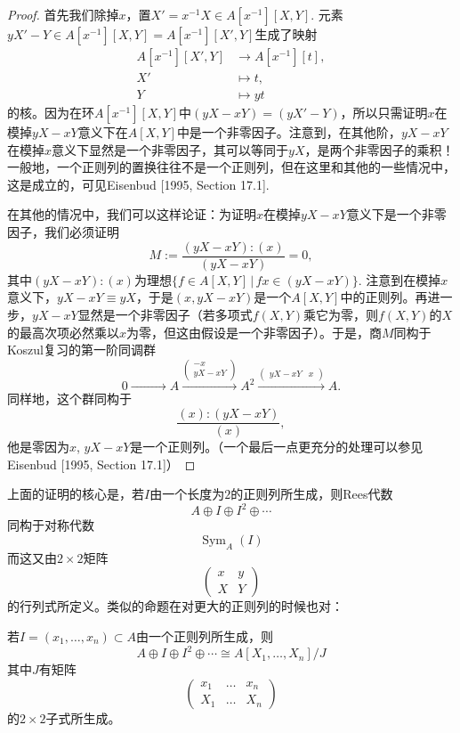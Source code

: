 \begin{proof}
首先我们除掉$x$，置$X'=x^{-1}X\in A[x^{-1}][X,Y]$. 元素$yX'-Y\in A[x^{-1}][X,Y]=A[x^{-1}][X',Y]$生成了映射
	\[
		\begin{aligned}
			A[x^{-1}][X',Y] & \longrightarrow A[x^{-1}][t],\\
			X' &\longmapsto t,\\
			Y  &\longmapsto yt
		\end{aligned}
	\]
的核。因为在环$A[x^{-1}][X,Y]$中$(yX-xY)=(yX'-Y)$，所以只需证明$x$在模掉$yX-xY$意义下在$A[X,Y]$中是一个非零因子。注意到，在其他阶，$yX-xY$在模掉$x$意义下显然是一个非零因子，其可以等同于$yX$，是两个非零因子的乘积！一般地，一个正则列的置换往往不是一个正则列，但在这里和其他的一些情况中，这是成立的，可见Eisenbud [1995, Section 17.1].

在其他的情况中，我们可以这样论证：为证明$x$在模掉$yX-xY$意义下是一个非零因子，我们必须证明
	\[
		M:=\frac{(yX-xY):(x)}{(yX-xY)}=0,
	\]
其中$(yX-xY):(x)$为理想$\{f\in A[X,Y]\,|\, fx\in (yX-xY)\}$. 注意到在模掉$x$意义下，$yX-xY\equiv yX$，于是$(x,yX-xY)$是一个$A[X,Y]$中的正则列。再进一步，$yX-xY$显然是一个非零因子（若多项式$f(X,Y)$乘它为零，则$f(X,Y)$的$X$的最高次项必然乘以$x$为零，但这由假设是一个非零因子）。于是，商$M$同构于Koszul复习的第一阶同调群
	\[
		0\xrightarrow{\qquad\quad\quad} A \xrightarrow{
		\begin{pmatrix}
			-x\\ yX-xY
		\end{pmatrix}}A^2
		\xrightarrow{\begin{pmatrix}
			yX-xY& x
		\end{pmatrix}}A.
	\]
同样地，这个群同构于
	\[
		\frac{(x):(yX-xY)}{(x)},
	\]	
他是零因为$x$, $yX-xY$是一个正则列。（一个最后一点更充分的处理可以参见Eisenbud [1995, Section 17.1]）
\end{proof}


上面的证明的核心是，若$I$由一个长度为$2$的正则列所生成，则Rees代数
\[
	A\oplus I \oplus I^2\oplus \cdots
\]
同构于对称代数
\[
	\operatorname{Sym}_A(I)
\]
而这又由$2\times 2$矩阵
\[
	\begin{pmatrix}
		x&y\\
		X&Y
	\end{pmatrix}
\]
的行列式所定义。类似的命题在对更大的正则列的时候也对：

\begin{exe}\label{exe:4.26}
	若$I=(x_1,\dots,x_n)\subset A$由一个正则列所生成，则
\[
	A\oplus I \oplus I^2\oplus \cdots\cong A[X_1,\dots,X_n]/J
\]
其中$J$有矩阵
\[
	\begin{pmatrix}
		x_1&\dots&x_n\\
		X_1&\dots&X_n
	\end{pmatrix}
\]
的$2\times 2$子式所生成。
\end{exe}

